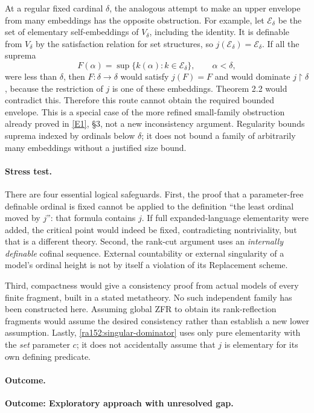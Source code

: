 \documentclass[11pt]{article}
\newcommand{\eref}[2]{\hyperlink{extra:#1:#2}{[E#2]}}
\begin{document}
At a regular fixed cardinal $\delta$, the analogous attempt to make an upper
envelope from many embeddings has the opposite obstruction.  For example,
let $\mathcal E_\delta$ be the set of elementary self-embeddings of $V_\delta$,
including the identity.  It is definable from $V_\delta$ by the satisfaction
relation for set structures, so $j(\mathcal E_\delta)=\mathcal E_\delta$.
If all the suprema
\[
 F(\alpha)=\sup\{k(\alpha):k\in\mathcal E_\delta\},\qquad \alpha<\delta,
\]
were less than $\delta$, then $F:\delta\to\delta$ would satisfy $j(F)=F$ and
would dominate $j\!\upharpoonright\!\delta$, because the restriction of $j$
is one of these embeddings.  Theorem 2.2 would contradict this.  Therefore
this route cannot obtain the required bounded envelope.  This is a special
case of the more refined small-family obstruction already proved in
\eref{152}{1}, \S3, not a new inconsistency argument.  Regularity bounds
suprema indexed by ordinals below $\delta$; it does not bound a family of
arbitrarily many embeddings without a justified size bound.

\paragraph{Stress test.}
There are four essential logical safeguards.  First, the proof that a
parameter-free definable ordinal is fixed cannot be applied to the definition
``the least ordinal moved by $j$'': that formula contains $j$.  If full
expanded-language elementarity were added, the critical point would indeed
be fixed, contradicting nontriviality, but that is a different theory.
Second, the rank-cut argument uses an \emph{internally definable} cofinal
sequence.  External countability or external singularity of a model's ordinal
height is not by itself a violation of its Replacement scheme.

Third, compactness would give a consistency proof from actual models of every
finite fragment, built in a stated metatheory.  No such independent family
has been constructed here.  Assuming global ZFR to obtain its rank-reflection
fragments would assume the desired consistency rather than establish a new
lower assumption.  Lastly, \eqref{ra152:singular-dominator} uses only pure
elementarity with the \emph{set} parameter $c$; it does not accidentally assume
that $j$ is elementary for its own defining predicate.  

\paragraph{Outcome.}
\textbf{Outcome: Exploratory approach with unresolved gap.}
\end{document}
